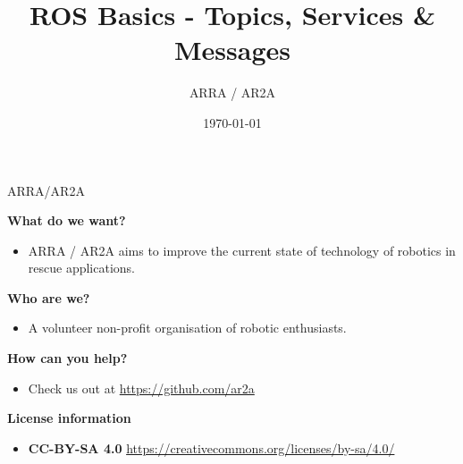 \documentclass{beamer}
\title[]{ROS Basics - Topics, Services \& Messages} %
\author{ARRA / AR2A} %
\institute %
{
Advancements for Robotics in Rescue Applications
}
\date{\today} %
\begin{document}
\begin{frame}
\titlepage %
\end{frame}
\begin{frame}{ARRA/AR2A}
\begin{large}\textbf{What do we want?}\end{large}
\begin{itemize}
 \item ARRA / AR2A aims to improve the current state of technology of robotics in rescue applications.
\end{itemize}
\begin{large}\textbf{Who are we?}\end{large}
\begin{itemize}
 \item A volunteer non-profit organisation of robotic enthusiasts.
\end{itemize}
\begin{large}\textbf{How can you help?}\end{large}
\begin{itemize}
 \item Check us out at \url{https://github.com/ar2a}
\end{itemize}
 \vspace{1cm}
\begin{large}\textbf{License information}\end{large}
\begin{itemize}
 \item \textbf{CC-BY-SA 4.0} \url{https://creativecommons.org/licenses/by-sa/4.0/}
\end{itemize}
\end{frame}
\end{document}
